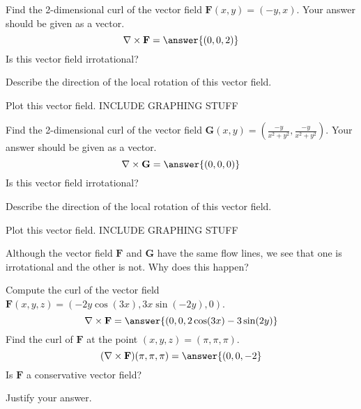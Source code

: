 \documentclass{ximera}
\begin{document}
\begin{problem}
Find the 2-dimensional curl of the vector field $\mathbf{F}(x,y) = (-y,x)$. Your answer should be given as a vector.
\[
\nabla\times\mathbf{F} = \answer{(0,0,2)}
\]
Is this vector field irrotational?
\begin{multipleChoice}
\end{multipleChoice}
Describe the direction of the local rotation of this vector field.
\begin{multipleChoice}
\end{multipleChoice}
Plot this vector field.
INCLUDE GRAPHING STUFF

Find the 2-dimensional curl of the vector field $\mathbf{G}(x,y) = \left(\frac{-y}{x^2+y^2}, \frac{-y}{x^2+y^2}\right)$. Your answer should be given as a vector.
\[
\nabla\times\mathbf{G} = \answer{(0,0,0)}
\]
Is this vector field irrotational?
\begin{multipleChoice}
\end{multipleChoice}
Describe the direction of the local rotation of this vector field.
\begin{multipleChoice}
\end{multipleChoice}
Plot this vector field.
INCLUDE GRAPHING STUFF

Although the vector field $\mathbf{F}$ and $\mathbf{G}$ have the same flow lines, we see that one is irrotational and the other is not. Why does this happen?
\begin{multipleChoice}
\end{multipleChoice}

\end{problem}

\begin{problem}
Compute the curl of the vector field $\mathbf{F}(x,y,z) = (-2y\cos(3x),3x\sin(-2y),0)$.
\[
\nabla\times \mathbf{F} = \answer{(0,0,2\cos(3x)-3\sin(2y)}
\]
Find the curl of $\mathbf{F}$ at the point $(x,y,z) = (\pi,\pi,\pi)$.
\[
(\nabla\times \mathbf{F})(\pi,\pi,\pi) = \answer{(0,0,-2}
\]
Is $\mathbf{F}$ a conservative vector field?
\begin{multipleChoice}
\end{multipleChoice}
Justify your answer.
\begin{freeResponse}
\end{freeResponse}
\end{problem}
\end{document}
